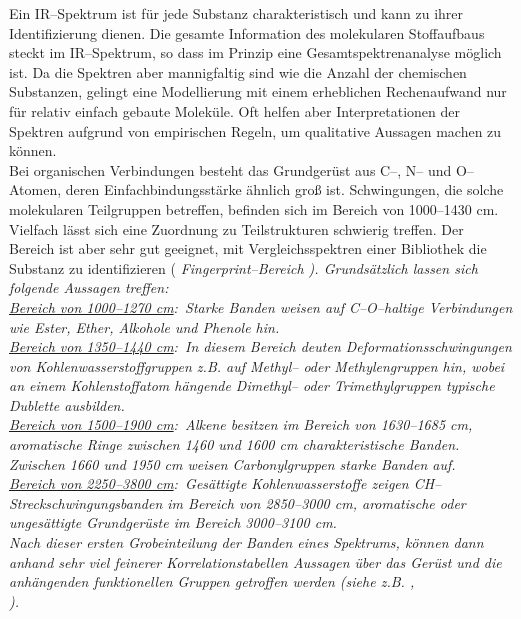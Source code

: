 Ein IR--Spektrum ist für jede Substanz charakteristisch und kann
zu ihrer Identifizierung dienen. Die gesamte Information des
molekularen Stoffaufbaus steckt im IR--Spektrum, so dass im
Prinzip eine Gesamtspektrenanalyse möglich ist. Da die Spektren
aber mannigfaltig sind wie die Anzahl der chemischen Substanzen,
gelingt eine Modellierung mit einem erheblichen Rechenaufwand nur
für relativ einfach gebaute Moleküle. Oft helfen aber
Interpretationen der Spektren aufgrund von empirischen Regeln, um
qualitative Aussagen machen zu können.\\

Bei organischen Verbindungen besteht das Grundgerüst aus C--, N--
und O--Atomen, deren Einfachbindungsstärke ähnlich gro{\ss} ist.
Schwingungen, die solche molekularen Teilgruppen betreffen,
befinden sich im Bereich von 1000--1430 cm. Vielfach lässt
sich eine Zuordnung zu Teilstrukturen schwierig treffen. Der
Bereich ist aber sehr gut geeignet, mit Vergleichsspektren einer
Bibliothek die Substanz zu identifizieren (\it
Fingerprint--Bereich \rm). Grundsätzlich lassen sich folgende
Aussagen treffen:\\

\noindent\underline{Bereich von 1000--1270 cm}:\ Starke
Banden weisen auf C--O--haltige Verbindungen wie Ester, Ether,
Alkohole und Phenole hin.\\

\noindent\underline{Bereich von 1350--1440 cm}:\ In diesem
Bereich deuten Deformationsschwingungen von
Kohlenwasserstoffgruppen z.B. auf Methyl-- oder Methylengruppen
hin, wobei an einem Kohlenstoffatom hängende Dimethyl-- oder
Trimethylgruppen typische Dublette ausbilden.\\

\noindent\underline{Bereich von 1500--1900 cm}:\ Alkene
besitzen im Bereich von 1630--1685 cm, aromatische Ringe
zwischen 1460 und 1600 cm charakteristische Banden.
Zwischen 1660 und 1950 cm weisen Carbonylgruppen starke
Banden auf.\\

\noindent\underline{Bereich von 2250--3800 cm}:\ Gesättigte
Kohlenwasserstoffe zeigen CH--Streck\-schwing\-ungs\-ban\-den im
Bereich von 2850--3000 cm, aromatische oder ungesättigte
Grundgerüste im Bereich 3000--3100 cm.\\

Nach dieser ersten Grobeinteilung der Banden eines Spektrums,
können dann anhand sehr viel feinerer Korrelationstabellen
Aussagen über das Gerüst und die anhängenden funktionellen Gruppen
getroffen werden (siehe z.B. \cite{günzler96},\\
\noindent\cite{gottwald97}).\\


